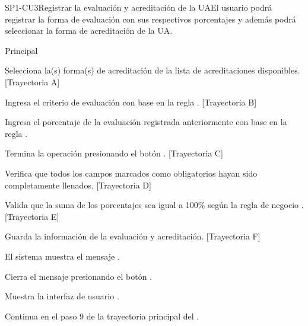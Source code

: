 \begin{UseCase}{SP1-CU3}{Registrar la evaluación y acreditación de la UA}{El usuario podrá registrar la forma de evaluación con sus respectivos porcentajes y además podrá seleccionar la forma de acreditación de la UA.}
{        }
\end{UseCase}

\begin{UCtrayectoria}{Principal}

    \UCpaso[\UCactor] Selecciona la(s) forma(s) de acreditación de la lista de acreditaciones disponibles. [Trayectoria A]

    \UCpaso[\UCactor] Ingresa el criterio de evaluación con base en la regla . [Trayectoria B]

    \UCpaso[\UCactor] Ingresa el porcentaje de la evaluación registrada anteriormente con base en la regla .

    \UCpaso[\UCactor] Termina la operación presionando el botón . [Trayectoria C]

    \UCpaso Verifica que todos los campos marcados como obligatorios hayan sido completamente llenados. [Trayectoria D]

    \UCpaso Valida que la suma de los porcentajes sea igual a 100\% según la regla de negocio . [Trayectoria E]

    \UCpaso Guarda la información de la evaluación y acreditación. [Trayectoria F]

    \UCpaso El sistema muestra el mensaje .

    \UCpaso[\UCactor] Cierra el mensaje presionando el botón .

    \UCpaso Muestra la interfaz de usuario .
    
    \UCpaso Continua en el paso 9 de la trayectoria principal del .
\end{UCtrayectoria}

